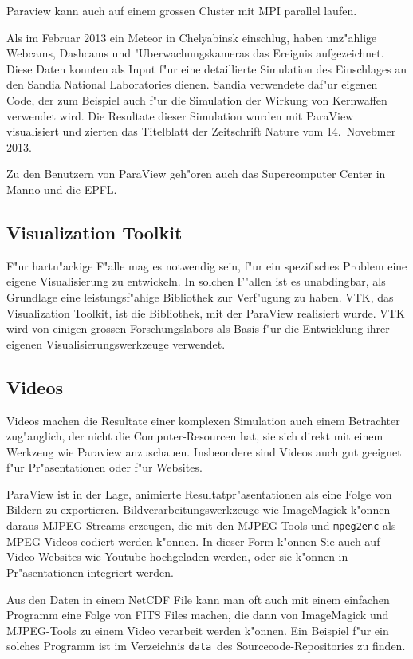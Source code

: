 Paraview kann auch auf einem grossen Cluster mit MPI parallel laufen.

Als im Februar 2013 ein Meteor in Chelyabinsk einschlug, haben unz"ahlige
Webcams, Dashcams und "Uberwachungskameras das Ereignis aufgezeichnet.
Diese Daten konnten als Input f"ur eine detaillierte Simulation
des Einschlages an den Sandia National Laboratories dienen.
Sandia verwendete daf"ur eigenen Code, der zum Beispiel auch f"ur 
die Simulation der Wirkung von Kernwaffen verwendet wird.
Die Resultate dieser Simulation wurden mit ParaView visualisiert
und zierten das Titelblatt der Zeitschrift Nature vom 14.~Novebmer 2013.

Zu den Benutzern von ParaView geh"oren auch das Supercomputer Center 
in Manno und die EPFL. 

\subsection{Visualization Toolkit}
F"ur hartn"ackige F"alle mag es notwendig sein, f"ur ein spezifisches
Problem eine eigene Visualisierung zu entwickeln.
In solchen F"allen ist es unabdingbar, als Grundlage eine leistungsf"ahige
Bibliothek zur Verf"ugung zu haben. 
VTK, das Visualization Toolkit, ist die Bibliothek, mit der ParaView
realisiert wurde.
VTK wird von einigen grossen Forschungslabors als Basis f"ur die
Entwicklung ihrer eigenen Visualisierungswerkzeuge verwendet.

\subsection{Videos}
Videos machen die Resultate einer komplexen Simulation auch einem
Betrachter zug"anglich, der nicht die Computer-Resourcen hat, sie sich
direkt mit einem Werkzeug wie Paraview anzuschauen. Insbeondere  sind
Videos auch gut geeignet f"ur Pr"asentationen oder f"ur Websites.

ParaView ist in der Lage, animierte Resultatpr"asentationen als eine 
Folge von Bildern zu exportieren. Bildverarbeitungswerkzeuge wie
ImageMagick k"onnen daraus MJPEG-Streams erzeugen, die mit den
MJPEG-Tools und {\tt mpeg2enc} als MPEG Videos codiert werden k"onnen.
In dieser Form k"onnen Sie auch auf Video-Websites wie Youtube hochgeladen
werden, oder sie k"onnen in Pr"asentationen integriert werden.

Aus den Daten in einem NetCDF File kann man oft auch mit einem
einfachen Programm eine Folge von FITS Files machen, die dann von ImageMagick
und MJPEG-Tools zu einem Video verarbeit werden k"onnen.
Ein Beispiel f"ur ein solches Programm ist im Verzeichnis 
{\tt data} des Sourcecode-Repositories zu finden.

